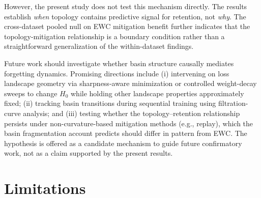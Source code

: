 \documentclass[10pt,twocolumn]{article}
\begin{document}
However, the present study does not test this mechanism directly. The results establish \emph{when} topology contains predictive signal for retention, not \emph{why}. The cross-dataset pooled null on EWC mitigation benefit further indicates that the topology-mitigation relationship is a boundary condition rather than a straightforward generalization of the within-dataset findings.

Future work should investigate whether basin structure causally mediates forgetting dynamics. Promising directions include (i) intervening on loss landscape geometry via sharpness-aware minimization or controlled weight-decay sweeps to change $H_0$ while holding other landscape properties approximately fixed; (ii) tracking basin transitions during sequential training using filtration-curve analysis; and (iii) testing whether the topology--retention relationship persists under non-curvature-based mitigation methods (e.g., replay), which the basin fragmentation account predicts should differ in pattern from EWC. The hypothesis is offered as a candidate mechanism to guide future confirmatory work, not as a claim supported by the present results.

\section{Limitations}
\label{sec:limitations}
\end{document}
